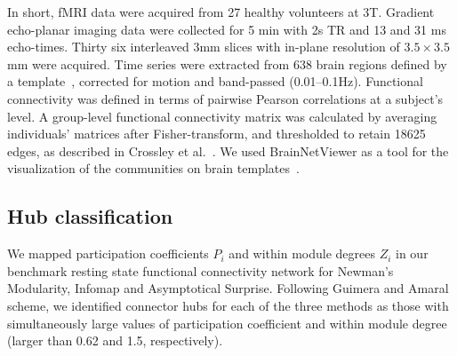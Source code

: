 In short, fMRI data were acquired from 27 healthy volunteers at 3T.
Gradient echo-planar imaging data were collected for 5 min with 2s TR and 13 and 31 ms echo-times. Thirty six interleaved 3mm slices with in-plane resolution of $3.5\times 3.5$ mm were acquired.
Time series were extracted from 638 brain regions defined by a template~\cite{crossley2013a}, corrected for motion and band-passed (0.01–0.1Hz). Functional connectivity was defined in terms of pairwise Pearson correlations at a subject's level.
A group-level functional connectivity matrix was calculated by averaging individuals' matrices after Fisher-transform, and thresholded to retain 18625 edges, as described in Crossley et al.~\cite{crossley2013a}.
We used BrainNetViewer as a tool for the visualization of the communities on brain templates~\cite{xia2013}.


\subsection{Hub classification}
We mapped participation coefficients $P_i$ and within module degrees $Z_i$ in our benchmark resting state functional connectivity network for Newman's Modularity, Infomap and Asymptotical Surprise. Following Guimera and Amaral scheme, we identified connector hubs for each of the three methods as those with simultaneously large values of participation coefficient and within module degree (larger than 0.62 and 1.5, respectively).


